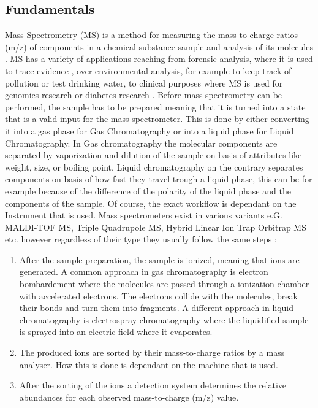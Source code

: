 \documentclass[11pt]{article}
\begin{document}
\subsection{Fundamentals}
Mass Spectrometry (MS) is a method for measuring the mass to charge ratios (m/z) of components in a  chemical substance sample and analysis of its molecules \cite{mass-specrometer}. MS has a variety of applications \cite{ms-applications} reaching from forensic analysis, where it is used to trace evidence , over environmental analysis, for example to keep track of pollution or test drinking water, to clinical purposes where MS is used for genomics research or diabetes research \cite{ms-diabetes}.
Before mass spectrometry can be performed, the sample has to be prepared meaning that it is turned into a state that is a valid input for the mass spectrometer. This is done by either converting it into a gas phase for Gas Chromatography or into a liquid phase for Liquid Chromatography. In Gas chromatography the molecular components are separated by vaporization and dilution of the sample on basis of attributes like weight, size, or boiling point. Liquid chromatography on the contrary separates components on basis of how fast they travel trough a liquid phase, this can be for example because of the difference of the polarity of the liquid phase and the components of the sample. Of course, the exact workflow is dependant on the Instrument that is used. Mass spectrometers exist in various variants e.G. MALDI-TOF MS, Triple Quadrupole MS, Hybrid Linear Ion Trap Orbitrap MS etc.  \cite{mass-specrometer-types} however regardless of their type they usually follow the same steps \cite{mass-specrometer, what-is-mass-spectrometry}: 

\begin{enumerate}
\item After the sample preparation, the sample is ionized, meaning that ions are generated. A common approach in gas chromatography is electron bombardement where the molecules are passed through a ionization chamber with accelerated electrons. The electrons collide with the molecules, break their bonds and turn them into fragments. A different approach in liquid
chromatography is electrospray chromatography where the liquidified sample is sprayed into an electric field where it evaporates.
\item The produced ions are sorted by their mass-to-charge ratios by a mass analyser. How this is done is dependant on the machine that is used.
\item After the sorting of the ions a detection system determines the relative abundances for each observed mass-to-charge (m/z) value.
\end{enumerate} 
\end{document}
